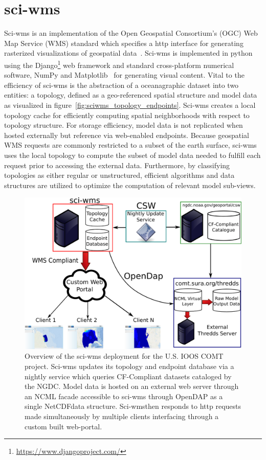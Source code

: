 \documentclass[11pt,twocolumn,twoside]{IEEEtran}
\newcommand{\comt}{COMT}
\newcommand{\ioos}{IOOS}
\newcommand{\ogc}{OGC}
\newcommand{\wms}{WMS}
\newcommand{\opendap}{OpenDAP}
\newcommand{\netcdf}{NetCDF}
\newcommand{\sciwms}{sci-wms}
\newcommand{\Sciwms}{Sci-wms}
\begin{document}
\section{\sciwms{}}
\Sciwms{} is an implementation of the Open Geospatial Consortium's
(\ogc{}) Web Map Service (\wms{}) standard which specifies a http
interface for generating rasterized visualizations of geospatial
data~\cite{wms14}. Sci-wms is implemented in python using the
Django\footnote{\url{https://www.djangoproject.com/}} web framework
and standard cross-platform numerical software, NumPy and
Matplotlib~\cite{numpy11, hunter07} for generating visual
content. Vital to the efficiency of \sciwms{} is the
abstraction of a oceanagraphic dataset into two entities: a topology,
defined as a geo-referenced spatial structure and model data as
visualized in figure~\ref{fig:sciwms_topology_endpoints}. \Sciwms{}
creates a local topology cache for efficiently computing spatial
neighborhoods with respect to topology structure.  For storage
efficiency, model data is not replicated when hosted externally but
reference via web-enabled endpoints. Because
geospatial \wms{} requests are commonly restricted to a subset of the
earth surface, \sciwms{} uses the local topology to compute the
subset of model data needed to fulfill each request prior to
accessing the external data. Furthermore, by classifying
topologies as either regular or unstructured, efficient algorithms and
data structures are utilized to optimize the computation of relevant
model sub-views.

\begin{figure}
  \centering
  \includegraphics[width=\columnwidth]{./figs/overview.pdf}
  \caption{Overview of the \sciwms{} deployment for the U.S. \ioos{}
    \comt{} project. \Sciwms{} updates its topology and endpoint
    database via a nightly service which queries CF-Compliant datasets
    cataloged by the NGDC. Model data is hosted on an external web
    server through an NCML facade accessible to \sciwms{} through
    \opendap{} as a single \netcdf data structure. \Sciwms then
    responds to http requests made simultaneously by multiple clients
    interfacing through a custom built web-portal.}
  \label{fig:overview1}
\end{figure}
\end{document}

